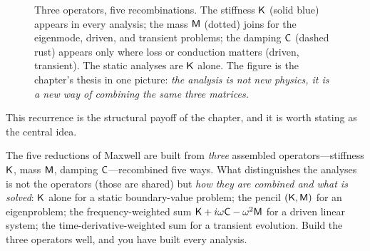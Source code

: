 \begin{figure}[t]
\centering
{}
\caption[The $\Kop/\Mop/\Cop$ recurrence]{Three operators, five recombinations.
The stiffness $\mathsf{K}$ (solid blue) appears in every analysis; the mass $\mathsf{M}$
(dotted) joins for the eigenmode, driven, and transient problems; the damping
$\mathsf{C}$ (dashed rust) appears only where loss or conduction matters (driven,
transient). The static analyses are $\mathsf{K}$ alone. The figure is the chapter's
thesis in one picture: \emph{the analysis is not new physics, it is a new way of
combining the same three matrices.}}
\label{fig:kmc}
\end{figure}

This recurrence is the structural payoff of the chapter, and it is worth stating
as the central idea.

\begin{keyidea}
The five reductions of Maxwell are built from \emph{three} assembled
operators---stiffness $\mathsf{K}$, mass $\mathsf{M}$, damping $\mathsf{C}$---recombined five ways.
What distinguishes the analyses is not the operators (those are shared) but
\emph{how they are combined and what is solved}: $\mathsf{K}$ alone for a static
boundary-value problem; the pencil $(\mathsf{K},\mathsf{M})$ for an eigenproblem; the
frequency-weighted sum $\mathsf{K}+i\omega\mathsf{C}-\omega^2\mathsf{M}$ for a driven linear
system; the time-derivative-weighted sum for a transient evolution. Build the
three operators well, and you have built every analysis.
\end{keyidea}

